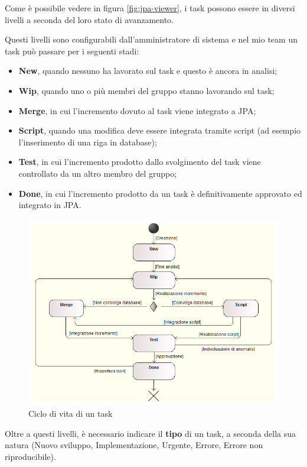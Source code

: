 Come è possibile vedere in figura \ref{fig:jpa-viewer}, i task possono essere
in diversi livelli a seconda del loro stato di avanzamento.

Questi livelli sono configurabili dall'amministratore di sistema e nel mio team
un task può passare per i seguenti stadi:

\begin{itemize}
	\item \textbf{New}, quando nessuno ha lavorato sul task e questo è ancora in
	analisi;
	\item \textbf{Wip}, quando uno o più membri del gruppo stanno lavorando sul
	task;
	\item \textbf{Merge}, in cui l'incremento dovuto al task viene integrato a
	JPA;
	\item \textbf{Script}, quando una modifica deve essere integrata tramite
	script (ad esempio l'inserimento di una riga in database);
	\item \textbf{Test}, in cui l'incremento prodotto dallo svolgimento del task
	viene controllato da un altro membro del gruppo;
	\item \textbf{Done}, in cui l'incremento prodotto da un task è definitivamente
	approvato ed integrato in JPA.
\end{itemize}

\begin{figure}%
\centering
\includegraphics[width=.9\columnwidth]{immagini/task-life-cycle}%
\caption{Ciclo di vita di un task}%
\label{fig:task-lifecycle}%
\end{figure}

Oltre a questi livelli, è necessario indicare il \textbf{tipo} di un task, a
seconda della sua natura (Nuovo sviluppo, Implementazione, Urgente, Errore,
Errore non riproducibile).

